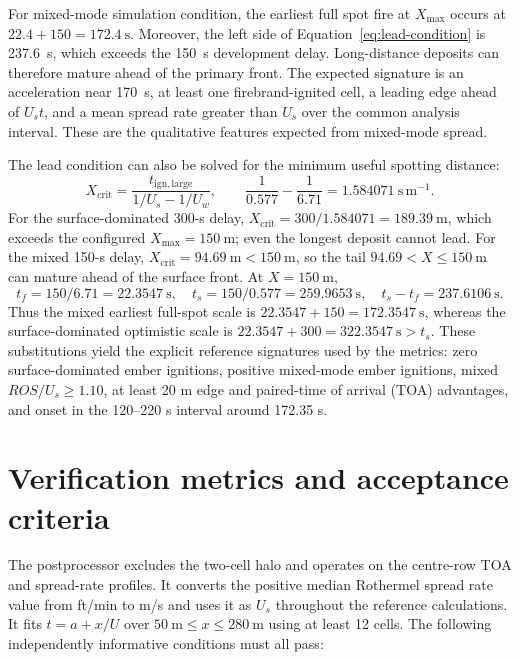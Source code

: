For mixed-mode simulation condition, the earliest full spot fire at $X_{\max}$ occurs at
$22.4+150=\SI{172.4}{\second}$. Moreover, the left side of
Equation~\ref{eq:lead-condition} is \SI{237.6}{\second}, which exceeds the
\SI{150}{\second} development delay. Long-distance deposits can therefore
mature ahead of the primary front. The expected signature is an acceleration
near \SI{170}{\second}, at least one firebrand-ignited cell, a leading edge
ahead of $U_s t$, and a mean spread rate greater than $U_s$ over the common
analysis interval. These are the qualitative features expected from mixed-mode spread.

The lead condition can also be solved for the minimum useful spotting
distance:
\[
 X_{\mathrm{crit}}=
 \frac{t_{\mathrm{ign,large}}}{1/U_s-1/U_w},\qquad
 \frac{1}{0.577}-\frac{1}{6.71}=1.584071~\mathrm{s\,m^{-1}}.
\]
For the surface-dominated 300-s delay,
\(X_{\mathrm{crit}}=300/1.584071=189.39~\mathrm{m}\), which exceeds the
configured \(X_{\max}=150~\mathrm{m}\); even the longest deposit cannot lead.
For the mixed 150-s delay,
\(X_{\mathrm{crit}}=94.69~\mathrm{m}<150~\mathrm{m}\), so the tail
\(94.69<X\leq150~\mathrm{m}\) can mature ahead of the surface front.
At \(X=150~\mathrm{m}\),
\[
 t_f=150/6.71=22.3547~\mathrm{s},\quad
 t_s=150/0.577=259.9653~\mathrm{s},\quad
 t_s-t_f=237.6106~\mathrm{s}.
\]
Thus the mixed earliest full-spot scale is
\(22.3547+150=172.3547~\mathrm{s}\), whereas the
surface-dominated optimistic scale is
\(22.3547+300=322.3547~\mathrm{s}>t_s\).
These substitutions yield the explicit reference signatures used by the
metrics: zero surface-dominated ember ignitions, positive mixed-mode ember
ignitions, mixed \(ROS/U_s\geq1.10\), at least 20 m edge and paired-time of arrival (TOA)
advantages, and onset in the 120--220 s interval around 172.35 s.

\section{Verification metrics and acceptance criteria}

The postprocessor excludes the two-cell halo and operates on the centre-row
TOA and spread-rate profiles. It converts the positive median Rothermel
spread rate value from ft/min to m/s and uses it as $U_s$ throughout the
reference calculations. It fits $t=a+x/U$ over
$\SI{50}{\metre}\le x\le\SI{280}{\metre}$ using at least 12 cells.
The following independently informative conditions must all pass:

